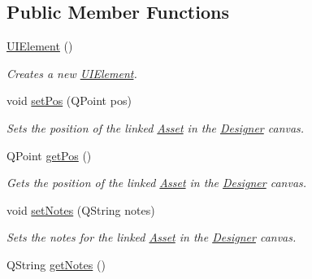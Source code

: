 \subsection*{Public Member Functions}
\begin{DoxyCompactItemize}
\item 
\hyperlink{class_picto_1_1_u_i_element_a2da63f89e1b7df00848cb9f3ea549066}{U\-I\-Element} ()
\begin{DoxyCompactList}\small\item\em Creates a new \hyperlink{class_picto_1_1_u_i_element}{U\-I\-Element}. \end{DoxyCompactList}\item 
\hypertarget{class_picto_1_1_u_i_element_ac263c508ca69f3522fa391f40b8f9249}{void \hyperlink{class_picto_1_1_u_i_element_ac263c508ca69f3522fa391f40b8f9249}{set\-Pos} (Q\-Point pos)}\label{class_picto_1_1_u_i_element_ac263c508ca69f3522fa391f40b8f9249}

\begin{DoxyCompactList}\small\item\em Sets the position of the linked \hyperlink{class_picto_1_1_asset}{Asset} in the \hyperlink{class_designer}{Designer} canvas. \end{DoxyCompactList}\item 
\hypertarget{class_picto_1_1_u_i_element_aeed84d1cab08d5f2db750382f64ee13f}{Q\-Point \hyperlink{class_picto_1_1_u_i_element_aeed84d1cab08d5f2db750382f64ee13f}{get\-Pos} ()}\label{class_picto_1_1_u_i_element_aeed84d1cab08d5f2db750382f64ee13f}

\begin{DoxyCompactList}\small\item\em Gets the position of the linked \hyperlink{class_picto_1_1_asset}{Asset} in the \hyperlink{class_designer}{Designer} canvas. \end{DoxyCompactList}\item 
\hypertarget{class_picto_1_1_u_i_element_aea3b0cae681bf57c044a2984f13e532c}{void \hyperlink{class_picto_1_1_u_i_element_aea3b0cae681bf57c044a2984f13e532c}{set\-Notes} (Q\-String notes)}\label{class_picto_1_1_u_i_element_aea3b0cae681bf57c044a2984f13e532c}

\begin{DoxyCompactList}\small\item\em Sets the notes for the linked \hyperlink{class_picto_1_1_asset}{Asset} in the \hyperlink{class_designer}{Designer} canvas. \end{DoxyCompactList}\item 
\hypertarget{class_picto_1_1_u_i_element_a3569d88148c88ae6b90a16d3ea12c5f9}{Q\-String \hyperlink{class_picto_1_1_u_i_element_a3569d88148c88ae6b90a16d3ea12c5f9}{get\-Notes} ()}\label{class_picto_1_1_u_i_element_a3569d88148c88ae6b90a16d3ea12c5f9}


\end{DoxyCompactItemize}
